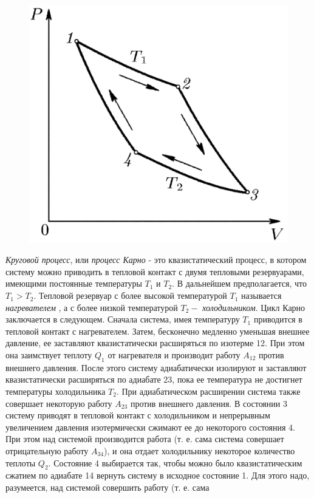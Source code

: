 \documentclass[14pt,a4paper]{scrartcl}
\begin{document}
 		\begin{figure} 
 			\vspace{-2ex}
 			\includegraphics[width=\linewidth]{karno.png}
 		\end{figure}
 		\quad \textit{Круговой процесс}, или \textit{процесс Карно} - это квазистатический процесс, в котором систему можно приводить в тепловой контакт	с двумя тепловыми резервуарами, имеющими постоянные температуры $T_1$ и $T_2$. В дальнейшем предполагается, что $T_1 > T_2$. Тепловой резервуар с более высокой температурой $T_1$ называется \textit{нагревателем} , а с более низкой температурой $T_2 -$	\textit{холодильником}. Цикл Карно заключается в следующем. Сначала система, имея температуру $T_1$ приводится в тепловой контакт с нагревателем. Затем, бесконечно медленно уменьшая внешнее давление, ее заставляют квазистатически расширяться по изотерме 12.	При этом она заимствует теплоту $Q_1$ от нагревателя и производит работу $A_{12}$ против внешнего давления. После этого систему адиабатически изолируют и заставляют квазистатически расширяться по адиабате 23, пока ее температура не достигнет температуры холодильника $T_2$. При адиабатическом расширении система также совершает некоторую работу $A_{23}$ против внешнего давления. В состоянии 3 систему приводят в тепловой контакт с холодильником и непрерывным увеличением давления изотермически сжимают ее до некоторого состояния 4.	При этом над системой производится работа (т. е. сама система совершает отрицательную работу $A_{34}$), и она отдает холодильнику некоторое количество теплоты $Q_2$. Состояние 4 выбирается так, чтобы можно было квазистатическим сжатием по адиабате 14 вернуть систему в исходное состояние 1. Для этого надо, разумеется, над системой совершить работу (т. е. сама
\end{document}
